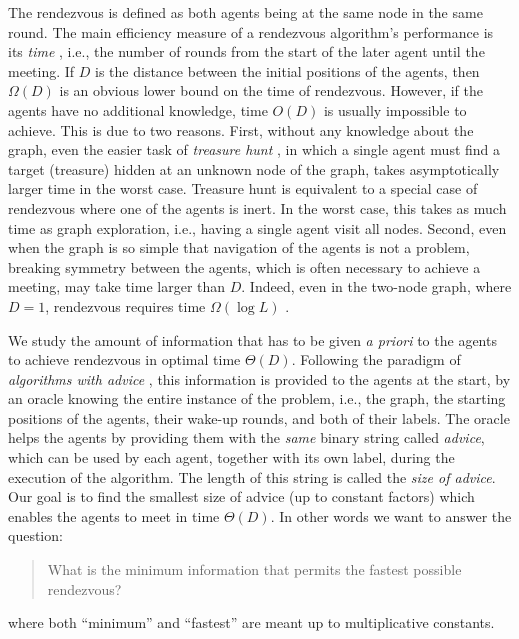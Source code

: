 \documentclass{llncs}
\begin{document}
The rendezvous is defined as both agents being at the same node in the same round.
The main efficiency measure of a rendezvous algorithm's performance is its {\em time} , i.e., the number of rounds from the start of the later agent until the meeting.
If $D$ is the distance between the initial positions of the agents, then $\Omega(D)$ is an obvious lower bound on the time of rendezvous. However, if the agents have no additional knowledge,
time $O(D)$ is usually impossible to achieve. This is due to two reasons. First, without any knowledge about the graph, even the easier task of {\em treasure hunt} \cite{TSZ07}, in
which a single agent must find a target (treasure) hidden at an unknown node of the graph, takes asymptotically larger time  in the worst case. Treasure hunt is equivalent to a special case of rendezvous  where one of the agents is inert. In the worst case, this takes as much time as graph exploration, i.e., having a single agent visit all nodes.
Second, even when the graph is so simple that navigation of the agents is not a problem, breaking symmetry between the agents, which is often necessary to achieve a meeting, may take time larger than $D$.
Indeed, even in the two-node graph, where $D=1$, rendezvous requires time $\Omega(\log L)$ \cite{DFKP}. 

We study the amount of information that has to be given  {\em a priori} to the agents to achieve rendezvous in optimal time $\Theta(D)$.
Following the paradigm of {\em algorithms
with advice}  \cite{AKM01,CFP,CFIKP,DP,EFKR,FGIP,FIP1,FIP2,FKL,FP,FPR,GPPR02,IKP,KKKP02,KKP05,SN,TZ05}, this information is provided to the agents at the start, by an oracle knowing the entire instance of the problem, i.e., the graph, the starting  positions of the agents, their wake-up rounds, and both of their labels. The oracle
helps the agents by providing them with the {\em same} binary string called {\em advice}, which can be used by each agent, together with its own label, during the execution of the algorithm. The length of this
string is called the {\em size of advice}.  Our goal is to find the smallest size of advice (up to constant factors) which enables the agents to meet in time $\Theta(D)$.
In other words we want to answer the question:

\begin{quotation}
What is the minimum information that permits the fastest possible rendezvous?
\end{quotation}

where both ``minimum'' and ``fastest'' are meant up to multiplicative constants. 
\end{document}
